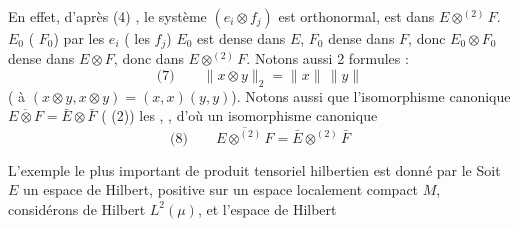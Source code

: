 \documentclass[11pt,a4paper]{article}
\begin{document}
En effet, d'après (4) , le système $(e_i \otimes f_j)$ est orthonormal, \struck{\ill{} \ill{}}  \struck{\ill{}} \ill{} \struck{\ill{}} \ill{}     est  dans $E \otimes^{(2)} F$.   $E_0$ ( $F_0$)     par les $e_i$ ( les $f_j$) \struck{\ill{}} \struck{\ill{}} $E_0$ est dense dans $E$, $F_0$ dense dans $F$, donc $E_0 \otimes F_0$ dense dans $E \otimes F$, donc  dans $E \otimes^{(2)} F$. Notons aussi 2 formules :
\[
  \text{(7)}\qquad \|x \otimes y\|_2 = \|x\|\,\|y\|
\]
 (   à \struck{\ill{}}   $(x \otimes y, x \otimes y) = (x,x)(y,y)$). \struck{\ill{}} Notons aussi que l'isomorphisme canonique $\overline{E \otimes F} = \bar{E} \otimes \bar{F}$ ( (2))   les  , , d'où un isomorphisme canonique
\[
  \text{(8)}\qquad \overline{E \otimes^{(2)} F} = \bar{E} \otimes^{(2)} \bar{F}
\]


L'exemple le plus important de produit tensoriel hilbertien est donné par le  Soit $E$ un espace de Hilbert,  positive sur un espace localement compact $M$, considérons  de Hilbert $L^{2}(\mu)$, et l'espace de Hilbert
\end{document}
